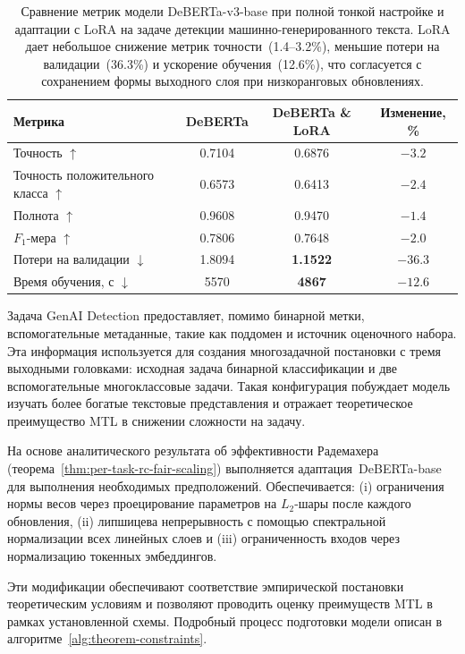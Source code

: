 \begin{table}[h!t]
    \caption{Сравнение метрик модели DeBERTa-v3-base при полной тонкой настройке и адаптации с LoRA на задаче детекции машинно-генерированного текста. LoRA дает небольшое снижение метрик точности~(1.4--3.2\%), меньшие потери на валидации~(36.3\%) и ускорение обучения~(12.6\%), что согласуется с сохранением формы выходного слоя при низкоранговых обновлениях.}
    \label{tab:combined}
    \centering
    \begin{tabular}{l c c c}
    \toprule
    Метрика & DeBERTa & DeBERTa \& LoRA & Изменение, \% \\
    \midrule
    Точность $\uparrow$        & 0.7104 & 0.6876 & $-3.2$ \\
    Точность положительного класса $\uparrow$      & 0.6573 & 0.6413 & $-2.4$ \\
    Полнота $\uparrow$         & 0.9608 & 0.9470 & $-1.4$ \\
    $F_{1}$-мера $\uparrow$  & 0.7806 & 0.7648 & $-2.0$ \\
    \midrule
    Потери на валидации $\downarrow$ & 1.8094 & \textbf{1.1522} & $-36.3$ \\
    Время обучения, с $\downarrow$ & 5570 & \textbf{4867} & $-12.6$ \\
    \bottomrule
    \end{tabular}
\end{table}

Задача GenAI Detection предоставляет, помимо бинарной метки, вспомогательные метаданные, такие как поддомен и источник оценочного набора.
Эта информация используется для создания многозадачной постановки с тремя выходными головками: исходная задача бинарной классификации и две вспомогательные многоклассовые задачи.
Такая конфигурация побуждает модель изучать более богатые текстовые представления и отражает теоретическое преимущество MTL в снижении сложности на задачу.

На основе аналитического результата об эффективности Радемахера (теорема~\ref{thm:per-task-rc-fair-scaling}) выполняется адаптация~DeBERTa-base для выполнения необходимых предположений.
Обеспечивается: (i) ограничения нормы весов через проецирование параметров на $L_2$-шары после каждого обновления, (ii) липшицева непрерывность с помощью спектральной нормализации всех линейных слоев и (iii) ограниченность входов через нормализацию токенных эмбеддингов.

Эти модификации обеспечивают соответствие эмпирической постановки теоретическим условиям и позволяют проводить оценку преимуществ MTL в рамках установленной схемы.
Подробный процесс подготовки модели описан в алгоритме~\ref{alg:theorem-constraints}.

